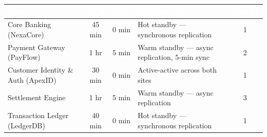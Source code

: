 \begin{tabularx}{\textwidth}{@{}l c c X c@{}}
  \toprule
  \rowcolor{tablehead}
  \textcolor{white}{\textbf{System}} & \textcolor{white}{\textbf{RTO}} & \textcolor{white}{\textbf{RPO}} & \textcolor{white}{\textbf{DR Strategy}} & \textcolor{white}{\textbf{Priority}}\\
  \midrule
  Core Banking (NexaCore) & 45 min & 0 min & Hot standby --- synchronous replication & 1\\
  \rowcolor{tablerow}
  Payment Gateway (PayFlow) & 1 hr & 5 min & Warm standby --- async replication, 5-min sync & 2\\
  Customer Identity \& Auth (ApexID) & 30 min & 0 min & Active-active across both sites & 1\\
  \rowcolor{tablerow}
  Settlement Engine & 1 hr & 5 min & Warm standby --- async replication & 3\\
  Transaction Ledger (LedgerDB) & 40 min & 0 min & Hot standby --- synchronous replication & 1\\
  \bottomrule
\end{tabularx}

\clearpage
